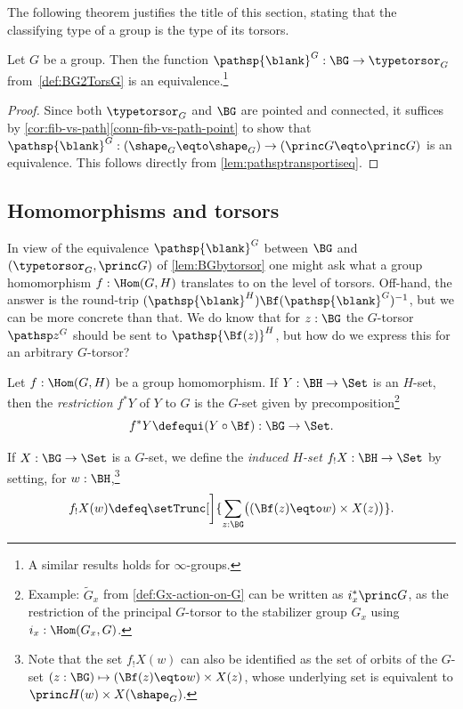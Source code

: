 The following theorem justifies the title of this section, stating that the
classifying type of a group is the type of its torsors.

\begin{theorem}\label{lem:BGbytorsor}
  Let $G$ be a group. Then the function $\pathsp{\blank}^G:\BG\to\typetorsor_G$
  from~\cref{def:BG2TorsG} is an equivalence.\footnote{A similar results holds
    for $\infty$-groups.}
\end{theorem}

\begin{proof}
  Since both $\typetorsor_G$ and $\BG$ are pointed and connected,
  it suffices by
  \cref{cor:fib-vs-path}\ref{conn-fib-vs-path-point} to show that 
  $\pathsp{\blank}^G:(\sh_G\eqto\sh_G)\to(\princ G\eqto \princ G)$
  is an equivalence.
  This follows directly from \cref{lem:pathsptransportiseq}.
\end{proof}

\subsection{Homomorphisms and torsors}
\label{sec:homotor}
In view of the equivalence $\pathsp{\blank}^G$ between $\BG$ and 
$(\typetorsor_G,\princ G)$ of \cref{lem:BGbytorsor} one might 
ask what a group homomorphism  $f:\Hom(G,H)$ translates to on 
the level of torsors.  Off-hand, the answer is the round-trip 
$(\pathsp{\blank}^H)\Bf(\pathsp{\blank}^G)^{-1}$, but we can be more concrete than that.
We do know that for $z:\BG$ the $G$-torsor $\pathsp z^G$ should be sent to
$\pathsp {\Bf(z)}^H$, but how do we express this for an arbitrary $G$-torsor?
\begin{definition}
  \label{def:restrictandinduce}
  Let $f:\Hom(G,H)$ be a group homomorphism.  If $Y:\BH\to\Set$ is an $H$-set,
  then the \emph{restriction}
  $f^*Y$ of $Y$ to $G$ is the $G$-set given by precomposition\footnote{%
  Example: $\tilde G_x$ from \cref{def:Gx-action-on-G} can
  be written as $i_x^* \princ G$, \ie as the restriction of the
  principal $G$-torsor to the stabilizer group $G_x$ using $i_x:\Hom(G_x,G)$.}
  \[
    f^*Y\defequi (Y\circ\Bf) :\BG\to\Set.
  \]

  If $X:\BG\to\Set$ is a $G$-set, we define
  the \emph{induced $H$-set}
  $f_!X : \BH\to\Set$ by setting, for $w:\BH$,\footnote{%
\label{ft:f_!X(w)-orbitset}
Note that the set $f_!X(w)$ can also be identified as the set of orbits of the
$G$-set $(z:\BG) \mapsto (\Bf(z) \eqto w)\times X(z)$, whose underlying set is
equivalent to $\princ H(w)\times X(\sh_G)$.}
  \[
    f_!X(w)\defeq\setTrunc[\bigg]%
    {\sum_{z:\BG}\bigl((\Bf(z) \eqto w)\times X(z)\bigr)}.\qedhere
  \]
\end{definition}

